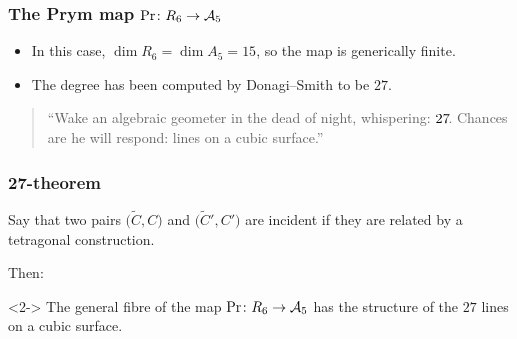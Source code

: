 \begin{frame}
\frametitle{The Prym map $\Pr \colon R_6 \to \mathcal{A}_5$}

\begin{itemize}
	\item In this case, $\dim R_6 = \dim A_5 = 15$, so the map is generically finite.
	\pause
	\item The degree has been computed by Donagi--Smith to be $27$.
\end{itemize}

\pause

\vfill
\begin{quote}
    \large
    ``Wake an algebraic geometer in the dead of night, \phantom{``}whispering: $27\mkern-3mu$. Chances are he will respond: lines on a \phantom{``}cubic surface.''
\end{quote}
\vfill 

\end{frame}

\begin{frame}
\frametitle{27-theorem}

\begin{definition}
Say that two pairs $\Big(\widetilde C, C\Big)$ and $\Big(\widetilde C', C'\Big)$ are \alert{incident} if they are related by a tetragonal construction.
\end{definition}

\vspace*{1.5ex}
Then:
\vspace*{1ex}

\begin{theorem}<2->
The general fibre of the map $\Pr \colon R_6 \to \mathcal{A}_5$ has the structure of the $27$ lines on a cubic surface.
\end{theorem}

\end{frame}